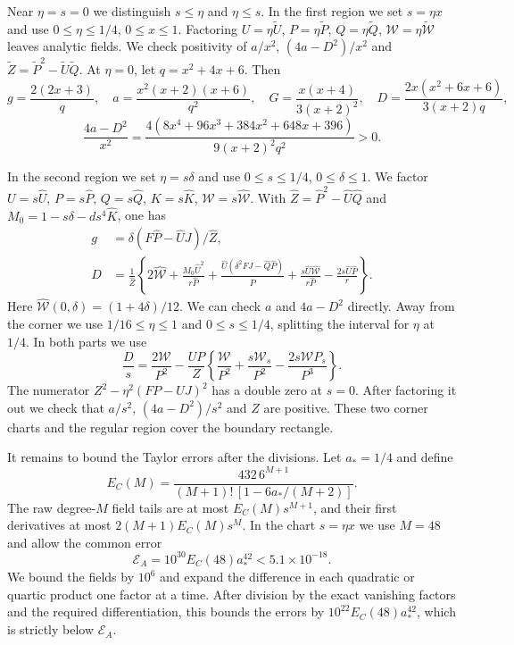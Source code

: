 \documentclass[a4paper,11pt]{amsart}
\numberwithin{equation}{section}
\theoremstyle{plain}
\theoremstyle{definition}
\begin{document}
Near \(\eta=s=0\) we distinguish \(s\le\eta\) and
\(\eta\le s\). In the first region we set \(s=\eta x\) and use
\(0\le\eta\le1/4\), \(0\le x\le1\). Factoring
\(U=\eta\widetilde U\), \(P=\eta\widetilde P\),
\(Q=\eta\widetilde Q\), \(\mathcal W=\eta\widetilde{\mathcal W}\)
leaves analytic fields. We check positivity of \(a/x^2\),
\((4a-D^2)/x^2\) and
\(\widetilde Z=\widetilde P^2-\widetilde U\widetilde Q\).
At \(\eta=0\), let \(q=x^2+4x+6\). Then
\[
 g=\frac{2(2x+3)}q,\quad
 a=\frac{x^2(x+2)(x+6)}{q^2},\quad
 G=\frac{x(x+4)}{3(x+2)^2},\quad
 D=\frac{2x(x^2+6x+6)}{3(x+2)q},
\]
\[
 \frac{4a-D^2}{x^2}
 =\frac{4(8x^4+96x^3+384x^2+648x+396)}{9(x+2)^2q^2}>0.
\]

In the second region we set \(\eta=s\delta\) and use
\(0\le s\le1/4\), \(0\le\delta\le1\). We factor
\(U=s\widehat U\), \(P=s\widehat P\),
\(Q=s\widehat Q\), \(K=s\widehat K\),
\(\mathcal W=s\widehat{\mathcal W}\). With
$\widehat Z=\widehat P^2-\widehat U\widehat Q$ and
$M_0=1-s\delta-ds^4\widehat K$, one has
\begin{align*}
 g&=\delta(F\widehat P-\widehat UJ)/\widehat Z,\\
 D&=\frac{1}{\widehat Z}\left\{
 2\widehat{\mathcal W}
 +\frac{M_0\widehat U^2}{r\widehat P}
 +\frac{\widehat U(\delta^2FJ-\widehat Q\widehat P)}{\widehat P}
 +\frac{s\widehat U\widehat{\mathcal W}}{r\widehat P}
 -\frac{2s\widehat U\widehat P}{r}\right\}.
\end{align*}
Here \(\widehat{\mathcal W}(0,\delta)=(1+4\delta)/12\).
We can check \(a\) and \(4a-D^2\) directly.
Away from the corner we use \(1/16\le\eta\le1\) and
\(0\le s\le1/4\), splitting the interval for \(\eta\) at \(1/4\).
In both parts we use
\[
 \frac Ds=\frac{2\mathcal W}{P^2}
 -\frac{UP}{Z}\left\{\frac{\mathcal W}{P^2}
   +\frac{s\mathcal W_s}{P^2}-\frac{2s\mathcal WP_s}{P^3}\right\}.
\]
The numerator \(Z^2-\eta^2(FP-UJ)^2\) has a double zero at
\(s=0\). After factoring it out we check that \(a/s^2\),
\((4a-D^2)/s^2\) and \(Z\) are positive. These two corner
charts and the regular region cover the boundary rectangle.

It remains to bound the Taylor errors after the divisions.
Let \(a_*=1/4\) and define
\[
 E_C(M)=\frac{432\,6^{M+1}}
 {(M+1)!\,[1-6a_* /(M+2)]}.
\]
The raw degree-$M$ field tails are at most $E_C(M)s^{M+1}$,
and their first derivatives at most $2(M+1)E_C(M)s^M$.
In the chart \(s=\eta x\) we use \(M=48\) and allow the common error
\[
 \mathcal E_A=10^{30}E_C(48)a_*^{42}<5.1\times10^{-18}.
\]
We bound the fields by \(10^6\) and expand the difference in each
quadratic or quartic product one factor at a time. After division
by the exact vanishing factors and the required differentiation,
this bounds the errors by \(10^{22}E_C(48)a_*^{42}\), which is
strictly below \(\mathcal E_A\).
\end{document}
